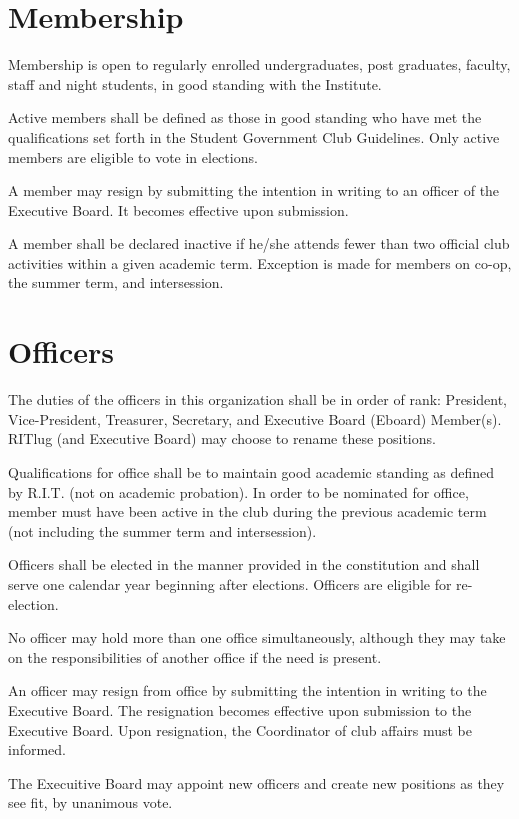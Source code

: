 \section{Membership}
\begin{subroutines}
\item Membership is open to regularly enrolled undergraduates, post graduates, faculty, staff and night students, in good standing with the Institute.
\item Active members shall be defined as those in good standing who have met the qualifications set forth in the Student Government Club Guidelines. Only active members are eligible to vote in elections.
\item A member may resign by submitting the intention in writing to an officer of the Executive Board. It becomes effective upon submission.
\item A member shall be declared inactive if he/she attends fewer than two official club activities within a given academic term. Exception is made for members on co-op, the summer term, and intersession.
\end{subroutines}

\section{Officers}
\begin{subroutines}
\item The duties of the officers in this organization shall be in order of rank: President, Vice-President, Treasurer, Secretary, and Executive Board (Eboard) Member(s). RITlug (and Executive Board) may choose to rename these positions.
\item Qualifications for office shall be to maintain good academic standing as defined by R.I.T. (not on academic probation). In order to be nominated for office, member must have been active in the club during the previous academic term (not including the summer term and intersession).
\item Officers shall be elected in the manner provided in the constitution and shall serve one calendar year beginning after elections. Officers are eligible for re-election.
\item No officer may hold more than one office simultaneously, although they may take on the responsibilities of another office if the need is present.
\item An officer may resign from office by submitting the intention in writing to the Executive Board. The resignation becomes effective upon submission to the Executive Board. Upon resignation, the Coordinator of club affairs must be informed.
\item The Execuitive Board may appoint new officers and create new positions as they see fit, by unanimous vote.
\end{subroutines}

